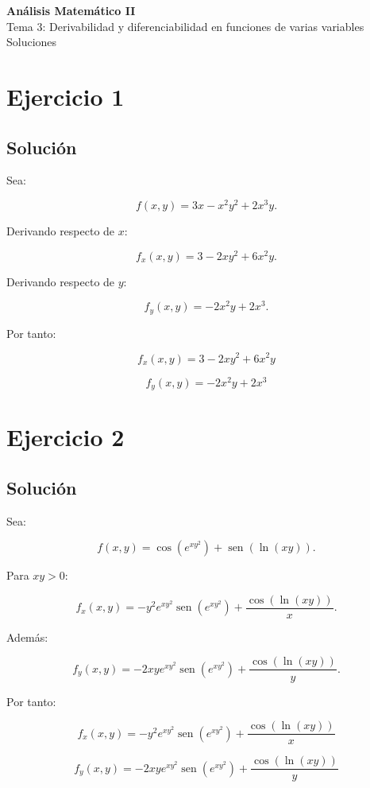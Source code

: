 \documentclass[11pt,a4paper]{article}
\newcommand{\sen}{\operatorname{sen}}
\begin{document}
\begin{center}
{\LARGE\bfseries Análisis Matemático II}\\[0.4em]
{\Large Tema 3: Derivabilidad y diferenciabilidad en funciones de varias variables}\\[0.4em]
{\large Soluciones}
\end{center}

\section{Ejercicio 1}
\subsection{Solución}

Sea:

\[
f(x,y)=3x-x^2y^2+2x^3y.
\]

Derivando respecto de \(x\):

\[
f_x(x,y)
=
3-2xy^2+6x^2y.
\]

Derivando respecto de \(y\):

\[
f_y(x,y)
=
-2x^2y+2x^3.
\]

Por tanto:

\[
\boxed{
f_x(x,y)=3-2xy^2+6x^2y
}
\]

\[
\boxed{
f_y(x,y)=-2x^2y+2x^3
}
\]

\section{Ejercicio 2}
\subsection{Solución}

Sea:

\[
f(x,y)
=
\cos\left(e^{xy^2}\right)
+
\sen\left(\ln(xy)\right).
\]

Para \(xy>0\):

\[
f_x(x,y)
=
-y^2e^{xy^2}
\sen\left(e^{xy^2}\right)
+
\frac{\cos(\ln(xy))}{x}.
\]

Además:

\[
f_y(x,y)
=
-2xye^{xy^2}
\sen\left(e^{xy^2}\right)
+
\frac{\cos(\ln(xy))}{y}.
\]

Por tanto:

\[
\boxed{
f_x(x,y)
=
-y^2e^{xy^2}
\sen\left(e^{xy^2}\right)
+
\frac{\cos(\ln(xy))}{x}
}
\]

\[
\boxed{
f_y(x,y)
=
-2xye^{xy^2}
\sen\left(e^{xy^2}\right)
+
\frac{\cos(\ln(xy))}{y}
}
\]
\end{document}
